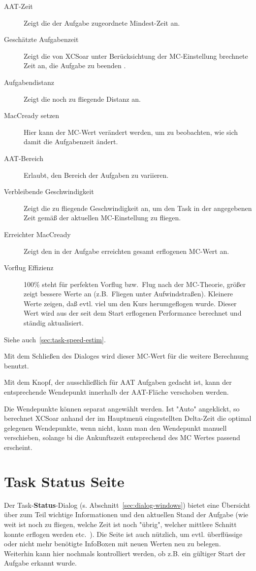 \begin{description}
\item[AAT-Zeit]  Zeigt die der Aufgabe zugeordnete Mindest-Zeit an.
\item[Geschätzte Aufgabenzeit]  Zeigt die von \textsf{XCSoar} unter Berücksichtung der MC-Einstellung brechnete Zeit an, die Aufgabe zu beenden .
\item[Aufgabendistanz]  Zeigt die noch zu fliegende Distanz an.
\item[MacCready setzen]  Hier kann der MC-Wert verändert werden, um zu beobachten, wie sich damit die Aufgabenzeit ändert. 
\item[AAT-Bereich] Erlaubt, den Bereich der Aufgaben zu variieren. 
\item[Verbleibende Geschwindigkeit]  Zeigt die zu fliegende Geschwindigkeit an, um den Task in der angegebenen Zeit gemäß der aktuellen MC-Einstellung zu fliegen.
\item[Erreichter MacCready]  Zeigt den in der Aufgabe erreichten gesamt erflogenen MC-Wert an.
\item[Vorflug Effizienz]  100\% steht für perfekten Vorflug bzw.\ Flug nach der MC-Theorie,  größer zeigt bessere Werte an (z.B.\ Fliegen unter Aufwindstraßen). Kleinere Werte zeigen, daß evtl. viel um den Kurs herumgeflogen wurde.
    Dieser Wert wird aus der seit dem Start erflogenen Performance berechnet und ständig aktualisiert.
\end{description}
Siehe auch~\ref{sec:task-speed-estim}.

Mit dem Schließen des Dialoges wird dieser MC-Wert für die weitere Berechnung benutzt.

Mit dem  Knopf, der ausschließlich für AAT Aufgaben gedacht ist, kann der entsprechende Wendepunkt innerhalb der AAT-Fläche verschoben werden.

 Die Wendepunkte können separat angewählt werden. Ist  "Auto" angeklickt, so berechnet \textsf{XCSoar} anhand der im  Hauptmenü eingestellten Delta-Zeit die optimal gelegenen Wendepunkte, wenn nicht, kann man den Wendepunkt manuell verschieben, solange bi die Ankunftszeit entsprechend des MC Wertes passend erscheint.
%
\section{Task Status Seite}
Der Task-\textbf{Status}-Dialog (s. Abschnitt~\ref{sec:dialog-windows}) bietet eine Übersicht über zum Teil  wichtige Informationen und den aktuellen Stand der Aufgabe (wie weit ist noch zu fliegen, welche Zeit ist noch "übrig", welcher mittlere Schnitt konnte erflogen werden  etc.\ ). Die Seite ist auch nützlich, um evtl. überflüssige oder nicht mehr benötigte InfoBoxen mit neuen Werten neu zu belegen. Weiterhin kann hier nochmals kontrolliert werden, ob z.B. ein gültiger Start der Aufgabe erkannt wurde.

